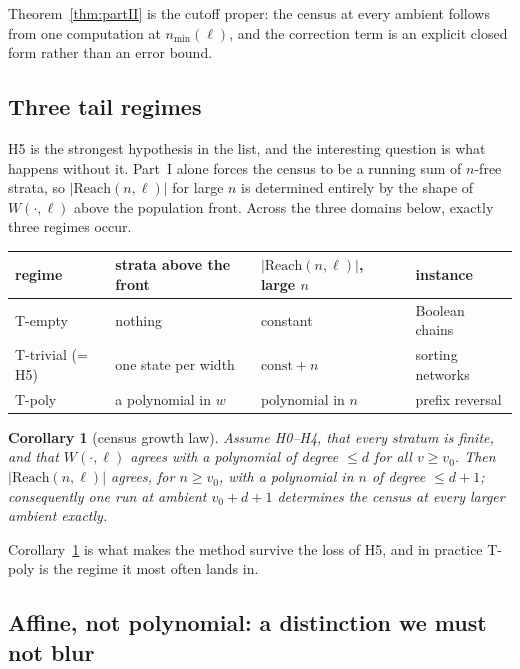 \documentclass[11pt,a4paper]{article}
\theoremstyle{plain}
\newtheorem{corollary}[theorem]{Corollary}
\theoremstyle{definition}
\theoremstyle{remark}
\newcommand{\Reach}{\mathrm{Reach}}
\newcommand{\nmin}{n_{\min}}
\begin{document}
Theorem~\ref{thm:partII} is the cutoff proper: the census at every ambient
follows from one computation at $\nmin(\ell)$, and the correction term is an
explicit closed form rather than an error bound.

\subsection{Three tail regimes}

H5 is the strongest hypothesis in the list, and the interesting question is
what happens without it. Part~I alone forces the census to be a running sum of
$n$-free strata, so $|\Reach(n,\ell)|$ for large $n$ is determined entirely by
the shape of $W(\cdot,\ell)$ above the population front. Across the three
domains below, exactly three regimes occur.

\begin{center}
\begin{tabular}{llll}
\toprule
regime & strata above the front & $|\Reach(n,\ell)|$, large $n$ & instance \\
\midrule
T-empty   & nothing                 & constant             & Boolean chains \\
T-trivial (= H5) & one state per width & $\mathrm{const} + n$ & sorting networks \\
T-poly    & a polynomial in $w$     & polynomial in $n$    & prefix reversal \\
\bottomrule
\end{tabular}
\end{center}

\begin{corollary}[census growth law]\label{cor:growth}
Assume H0--H4, that every stratum is finite, and that $W(\cdot,\ell)$ agrees
with a polynomial of degree $\le d$ for all $v \ge v_0$. Then
$|\Reach(n,\ell)|$ agrees, for $n \ge v_0$, with a polynomial in $n$ of degree
$\le d+1$; consequently one run at ambient $v_0 + d + 1$ determines the census
at every larger ambient exactly.
\end{corollary}

Corollary~\ref{cor:growth} is what makes the method survive the loss of H5, and
in practice T-poly is the regime it most often lands in.

\subsection{Affine, not polynomial: a distinction we must not blur}
\end{document}
